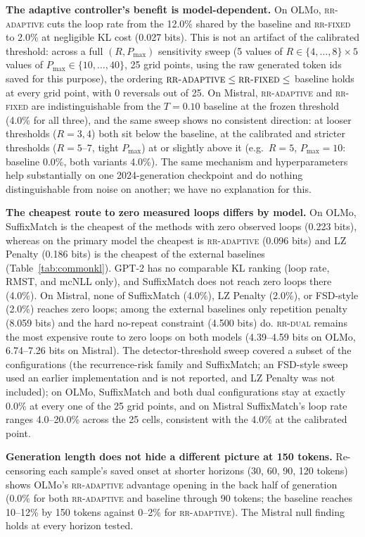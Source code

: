 \textbf{The adaptive controller's benefit is model-dependent.} On OLMo, \textsc{rr-adaptive} cuts the loop rate from the 12.0\% shared by the baseline and \textsc{rr-fixed} to 2.0\% at negligible KL cost (0.027 bits). This is not an artifact of the calibrated threshold: across a full $(R,P_{\max})$ sensitivity sweep (5 values of $R\in\{4,\ldots,8\}\times5$ values of $P_{\max}\in\{10,\ldots,40\}$, 25 grid points, using the raw generated token ids saved for this purpose), the ordering $\textsc{rr-adaptive}\le\textsc{rr-fixed}\le$ baseline holds at every grid point, with 0 reversals out of 25. On Mistral, \textsc{rr-adaptive} and \textsc{rr-fixed} are indistinguishable from the $T{=}0.10$ baseline at the frozen threshold (4.0\% for all three), and the same sweep shows no consistent direction: at looser thresholds ($R{=}3,4$) both sit below the baseline, at the calibrated and stricter thresholds ($R{=}5$--$7$, tight $P_{\max}$) at or slightly above it (e.g.\ $R{=}5$, $P_{\max}{=}10$: baseline 0.0\%, both variants 4.0\%). The same mechanism and hyperparameters help substantially on one 2024-generation checkpoint and do nothing distinguishable from noise on another; we have no explanation for this.

\textbf{The cheapest route to zero measured loops differs by model.} On OLMo, SuffixMatch is the cheapest of the methods with zero observed loops (0.223 bits), whereas on the primary model the cheapest is \textsc{rr-adaptive} (0.096 bits) and LZ Penalty (0.186 bits) is the cheapest of the external baselines (Table~\ref{tab:commonkl}). GPT-2 has no comparable KL ranking (loop rate, RMST, and mcNLL only), and SuffixMatch does not reach zero loops there (4.0\%). On Mistral, none of SuffixMatch (4.0\%), LZ Penalty (2.0\%), or FSD-style (2.0\%) reaches zero loops; among the external baselines only repetition penalty (8.059 bits) and the hard no-repeat constraint (4.500 bits) do. \textsc{rr-dual} remains the most expensive route to zero loops on both models (4.39--4.59 bits on OLMo, 6.74--7.26 bits on Mistral). The detector-threshold sweep covered a subset of the configurations (the recurrence-risk family and SuffixMatch; an FSD-style sweep used an earlier implementation and is not reported, and LZ Penalty was not included); on OLMo, SuffixMatch and both dual configurations stay at exactly 0.0\% at every one of the 25 grid points, and on Mistral SuffixMatch's loop rate ranges 4.0--20.0\% across the 25 cells, consistent with the 4.0\% at the calibrated point.

\textbf{Generation length does not hide a different picture at 150 tokens.} Re-censoring each sample's saved onset at shorter horizons (30, 60, 90, 120 tokens) shows OLMo's \textsc{rr-adaptive} advantage opening in the back half of generation (0.0\% for both \textsc{rr-adaptive} and baseline through 90 tokens; the baseline reaches 10--12\% by 150 tokens against 0--2\% for \textsc{rr-adaptive}). The Mistral null finding holds at every horizon tested.

